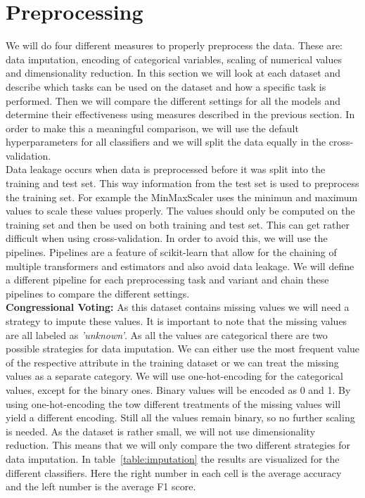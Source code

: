 \documentclass[a4paper,12pt]{article}
\begin{document}
\section{Preprocessing}
\label{sec:preprocessing}
We will do four different measures to properly preprocess the data. These are: data imputation, encoding of categorical variables,
scaling of numerical values and dimensionality reduction. In this section we will look at each dataset and 
describe which tasks can be used on the dataset and how a specific task is performed. Then we will compare the different
settings for all the models and determine their effectiveness using measures described in the previous section. 
In order to make this a meaningful comparison, we will use the default hyperparameters for all classifiers and 
we will split the data equally in the cross-validation.\\
Data leakage occurs when data is preprocessed before it was split into the training and test set. This way information 
from the test set is used to preprocess the training set. For example the MinMaxScaler uses the minimun and maximum values 
to scale these values properly. The values should only be computed on the training set and then be used on both training and 
test set. This can get rather difficult when using cross-validation. In order to avoid this, we will use the pipelines.    
Pipelines are a feature of scikit-learn that allow for the chaining of multiple transformers and estimators and also avoid 
data leakage. We will define a different pipeline for each preprocessing task and variant and chain these pipelines to compare 
the different settings.\\
\textbf{Congressional Voting:} As this dataset contains missing values we will need a strategy to impute these values. 
It is important to note that the missing values are all labeled as \textit{'unknown'}.
As all the values are categorical there are two possible strategies for data imputation.
We can either use the most frequent value of the respective attribute in the training dataset
or we can treat the missing values as a separate category. We will use one-hot-encoding for the categorical values,
except for the binary ones. Binary values will be encoded as 0 and 1. By using one-hot-encoding
the tow different treatments of the missing values will yield a different encoding. Still all the values remain binary, 
so no further scaling is needed. As the dataset is rather small, we will not use dimensionality reduction. This means
that we will only compare the two different strategies for data imputation.
In table~\ref{table:imputation} the results are visualized for the different classifiers.
Here the right number in each cell is the average accuracy and the left number is the average F1 score.
\end{document}
